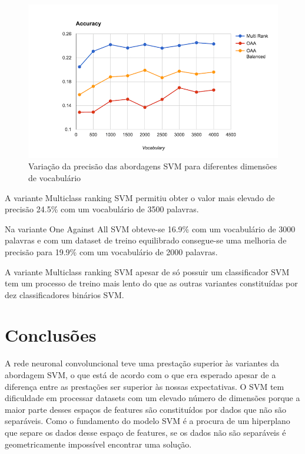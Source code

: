 \documentclass[extendedabs]{vcom}
\begin{document}
\begin{figure}[h]
\includegraphics[width=\linewidth]{images/svn_graph.png}
\caption{Variação da precisão das abordagens SVM para diferentes dimensões de vocabulário}
\label{fig:graph1}
\end{figure}

A variante Multiclass ranking SVM permitiu obter o valor mais elevado de precisão 24.5\% com um vocabulário de 3500 palavras. 

Na variante One Against All SVM obteve-se 16.9\% com um vocabulário de 3000 palavras e com um dataset de treino equilibrado consegue-se uma melhoria de precisão para 19.9\% com um vocabulário de 2000 palavras. 

A variante Multiclass ranking SVM apesar de só possuir um classificador SVM tem um processo de treino mais lento do que as outras variantes constituídas por dez classificadores binários SVM.

\section{Conclusões}
A rede neuronal convoluncional teve uma prestação superior às variantes da abordagem SVM, o que está de acordo com o que era esperado apesar de a diferença entre as prestações ser superior às nossas expectativas. O SVM tem dificuldade em processar datasets com um elevado número de dimensões porque a maior parte desses espaços de features são constituídos por dados que não são separáveis. Como o fundamento do modelo SVM é a procura de um hiperplano que separe os dados desse espaço de features, se os dados não são separáveis é geometricamente impossível encontrar uma solução. 
\end{document}
